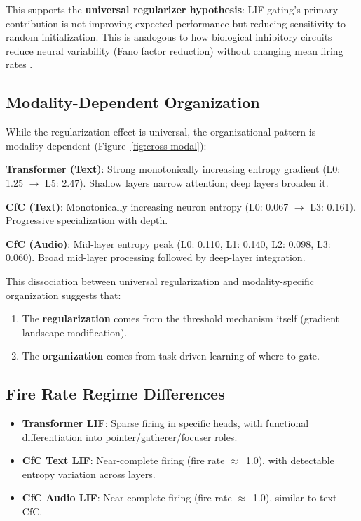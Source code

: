 \documentclass[11pt]{article}
\begin{document}
This supports the \textbf{universal regularizer hypothesis}: LIF gating's primary contribution is not improving expected performance but reducing sensitivity to random initialization. This is analogous to how biological inhibitory circuits reduce neural variability (Fano factor reduction) without changing mean firing rates \cite{churchland2010stimulus}.

\subsection{Modality-Dependent Organization}

While the regularization effect is universal, the organizational pattern is modality-dependent (Figure~\ref{fig:cross-modal}):

\textbf{Transformer (Text)}: Strong monotonically increasing entropy gradient (L0: 1.25 $\to$ L5: 2.47). Shallow layers narrow attention; deep layers broaden it.

\textbf{CfC (Text)}: Monotonically increasing neuron entropy (L0: 0.067 $\to$ L3: 0.161). Progressive specialization with depth.

\textbf{CfC (Audio)}: Mid-layer entropy peak (L0: 0.110, L1: 0.140, L2: 0.098, L3: 0.060). Broad mid-layer processing followed by deep-layer integration.

This dissociation between universal regularization and modality-specific organization suggests that:
\begin{enumerate}
    \item The \textbf{regularization} comes from the threshold mechanism itself (gradient landscape modification).
    \item The \textbf{organization} comes from task-driven learning of where to gate.
\end{enumerate}

\subsection{Fire Rate Regime Differences}

\begin{itemize}
    \item \textbf{Transformer LIF}: Sparse firing in specific heads,
    with functional differentiation into pointer/gatherer/focuser roles.
    \item \textbf{CfC Text LIF}: Near-complete firing (fire rate $\approx$~1.0), with
    detectable entropy variation across layers.
    \item \textbf{CfC Audio LIF}: Near-complete firing (fire rate $\approx$~1.0), similar to text CfC.
\end{itemize}
\end{document}
